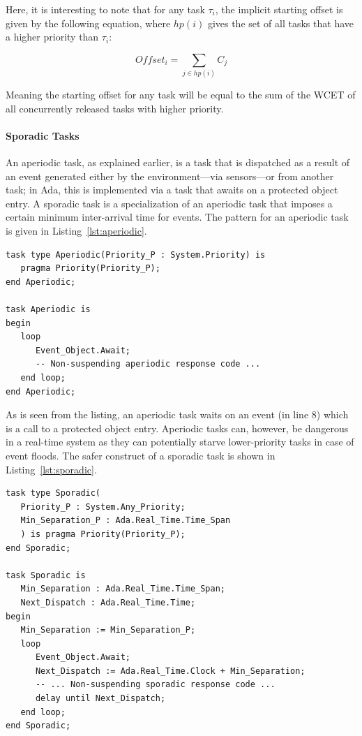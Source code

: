 Here, it is interesting to note that for any task $\tau_i$, the
implicit starting offset is given by the following equation, where
$hp(i)$ gives the set of all tasks that have a higher priority than
$\tau_i$:

\begin{displaymath}
Offset_i = \sum_{j\in hp(i)} C_j
\end{displaymath}

Meaning the starting offset for any task will be equal to the sum of
the WCET of all concurrently released tasks with higher priority.

\paragraph{Sporadic Tasks}
An aperiodic task, as explained earlier, is a task that is dispatched
as a result of an event generated either by the environment---via
sensors---or from another task; in Ada, this is implemented via a task
that awaits on a protected object entry. A sporadic task is a
specialization of an aperiodic task that imposes a certain minimum
inter-arrival time for events. The pattern for an aperiodic task is
given in Listing~\ref{lst:aperiodic}.

\begin{minipage}{\listingwidth}
\lstset{numbers=left,
numberstyle=\tiny}
\begin{lstlisting}[label=lst:aperiodic, caption=An aperiodic Ada
    Ravenscar task]
task type Aperiodic(Priority_P : System.Priority) is
   pragma Priority(Priority_P);
end Aperiodic;

task Aperiodic is
begin
   loop
      Event_Object.Await;
      -- Non-suspending aperiodic response code ...
   end loop;
end Aperiodic;
\end{lstlisting}
\end{minipage}

As is seen from the listing, an aperiodic task waits on an event (in
line 8) which is a call to a protected object entry. Aperiodic tasks
can, however, be dangerous in a real-time system as they can potentially
starve lower-priority tasks in case of event floods. The safer
construct of a sporadic task is shown in Listing~\ref{lst:sporadic}.

\begin{minipage}{\listingwidth}
\lstset{language=ada,
  numbers=left,
  numberstyle=\tiny
}
\begin{lstlisting}[label=lst:sporadic, caption=A sporadic Ada Ravenscar task]
task type Sporadic(
   Priority_P : System.Any_Priority;
   Min_Separation_P : Ada.Real_Time.Time_Span
   ) is pragma Priority(Priority_P);
end Sporadic;

task Sporadic is
   Min_Separation : Ada.Real_Time.Time_Span;
   Next_Dispatch : Ada.Real_Time.Time;
begin
   Min_Separation := Min_Separation_P;
   loop
      Event_Object.Await;
      Next_Dispatch := Ada.Real_Time.Clock + Min_Separation;
      -- ... Non-suspending sporadic response code ...
      delay until Next_Dispatch;
   end loop;
end Sporadic;
\end{lstlisting}
\end{minipage}


